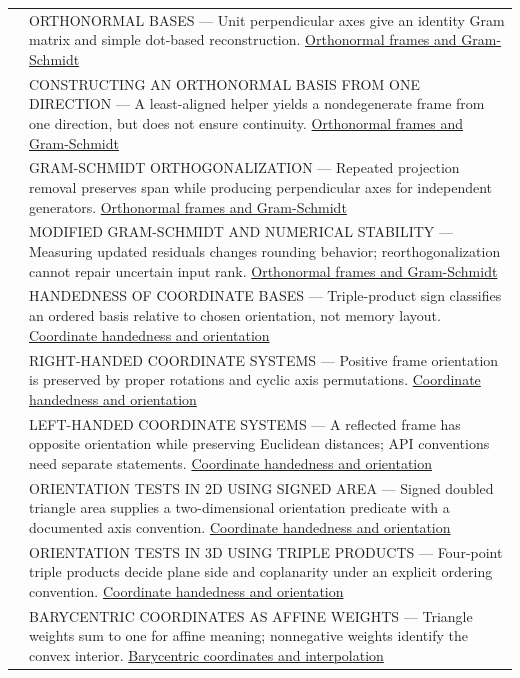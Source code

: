 {\begin{longtable}[]{@{}
  >{\raggedright\arraybackslash}p{}
  >{\raggedright\arraybackslash}p{}@{}}
559 & ORTHONORMAL BASES --- Unit perpendicular axes give an identity Gram matrix and simple dot-based reconstruction. \hyperref[appendix-c39f1ed34271]{Orthonormal frames and Gram-Schmidt} \\
560 & CONSTRUCTING AN ORTHONORMAL BASIS FROM ONE DIRECTION --- A least-aligned helper yields a nondegenerate frame from one direction, but does not ensure continuity. \hyperref[appendix-c39f1ed34271]{Orthonormal frames and Gram-Schmidt} \\
561 & GRAM-SCHMIDT ORTHOGONALIZATION --- Repeated projection removal preserves span while producing perpendicular axes for independent generators. \hyperref[appendix-c39f1ed34271]{Orthonormal frames and Gram-Schmidt} \\
562 & MODIFIED GRAM-SCHMIDT AND NUMERICAL STABILITY --- Measuring updated residuals changes rounding behavior; reorthogonalization cannot repair uncertain input rank. \hyperref[appendix-c39f1ed34271]{Orthonormal frames and Gram-Schmidt} \\
563 & HANDEDNESS OF COORDINATE BASES --- Triple-product sign classifies an ordered basis relative to chosen orientation, not memory layout. \hyperref[appendix-87d7626c8d37]{Coordinate handedness and orientation} \\
564 & RIGHT-HANDED COORDINATE SYSTEMS --- Positive frame orientation is preserved by proper rotations and cyclic axis permutations. \hyperref[appendix-87d7626c8d37]{Coordinate handedness and orientation} \\
565 & LEFT-HANDED COORDINATE SYSTEMS --- A reflected frame has opposite orientation while preserving Euclidean distances; API conventions need separate statements. \hyperref[appendix-87d7626c8d37]{Coordinate handedness and orientation} \\
566 & ORIENTATION TESTS IN 2D USING SIGNED AREA --- Signed doubled triangle area supplies a two-dimensional orientation predicate with a documented axis convention. \hyperref[appendix-87d7626c8d37]{Coordinate handedness and orientation} \\
567 & ORIENTATION TESTS IN 3D USING TRIPLE PRODUCTS --- Four-point triple products decide plane side and coplanarity under an explicit ordering convention. \hyperref[appendix-87d7626c8d37]{Coordinate handedness and orientation} \\
568 & BARYCENTRIC COORDINATES AS AFFINE WEIGHTS --- Triangle weights sum to one for affine meaning; nonnegative weights identify the convex interior. \hyperref[appendix-02b9d9a81dca]{Barycentric coordinates and interpolation} \\

\end{longtable}}
